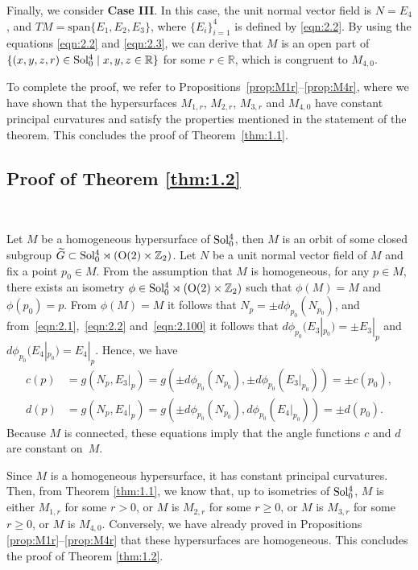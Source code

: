 \documentclass[reqno]{amsart}%
\theoremstyle{definition}
\numberwithin{equation}{section}
\begin{document}
	Finally, we consider {\bf Case III}. In this case, the unit normal
	vector field is $N=E_4$, and $TM=\text{span}\{E_1,E_2,E_3\}$,
	where $\{E_i\}_{i=1}^4$ is defined by \eqref{eqn:2.2}. By using the equations \eqref{eqn:2.2} and \eqref{eqn:2.3}, we can derive that $M$ is an open part of
	$\{(x,y,z,r)\in {\rm Sol_0^4}\mid x,y,z\in\mathbb{R}\}$
	for some $r\in\mathbb{R}$, which is congruent to $M_{4,0}$.
	
	To complete the proof, we refer to Propositions~\ref{prop:M1r}--\ref{prop:M4r}, where we have shown that the hypersurfaces $M_{1,r}$, $M_{2,r}$, $M_{3,r}$ and $M_{4,0}$ have constant principal curvatures and satisfy the properties mentioned in the statement of the theorem.
	This concludes the proof of Theorem~\ref{thm:1.1}.
	
	\subsection{Proof of Theorem \texorpdfstring{\ref{thm:1.2}}{1.2}}~
	
	Let $M$ be a homogeneous hypersurface of ${\rm Sol_0^4}$, 
	then $M$ is an orbit of some closed subgroup $\widetilde{G}\subset{\rm Sol_0^4}\rtimes({\rm O(2)}\times\mathbb{Z}_2)$. 
	Let $N$ be a unit normal vector field of $M$ and fix a point $p_{0} \in M$.
	From the assumption that $M$ is homogeneous, for any $p \in M$,
	there exists an isometry $\phi\in {\rm Sol_0^4}\rtimes({\rm O(2)}\times\mathbb{Z}_2)$
	such that $\phi\left(M\right)=M$ and $\phi(p_{0})=p$.
	From $\phi(M)=M$ it follows that $N_{p}=\pm d \phi_{p_{0}}(N_{p_{0}})$, and from~\eqref{eqn:2.1},~\eqref{eqn:2.2} and~\eqref{eqn:2.100} it follows that
	$d\phi_{p_{0}} (E_3|_{p_{0}})=\pm E_3|_{p}$ and
	$d\phi_{p_{0}} (E_4|_{p_{0}})=E_4|_{p}$.
	Hence, we have
	$$
	\begin{aligned}
		c(p)&=g(N_{p},E_3|_{p})=g(\pm d \phi_{p_{0}}(N_{p_{0}}),\pm d\phi_{p_{0}} (E_3|_{p_{0}}))=\pm c(p_{0}),\\
		d(p)&=g(N_{p},E_4|_{p})=g(\pm d \phi_{p_{0}}(N_{p_{0}}),d\phi_{p_{0}} (E_4|_{p_{0}}))=\pm d(p_{0}).
	\end{aligned}
	$$
	Because $M$ is connected, these equations imply that
	the angle functions $c$ and $d$ are constant on~$M$.
	
	Since $M$ is a homogeneous hypersurface, it has constant principal curvatures. Then, from
	Theorem \ref{thm:1.1},
	we know that, up to isometries of ${\rm Sol_0^4}$,
	$M$ is either $M_{1,r}$ for some $r>0$, or $M$ is $M_{2,r}$ for some $r\geq0$,
	or $M$ is $M_{3,r}$ for some $r\geq0$, or $M$ is $M_{4,0}$.
	Conversely, we have already proved in Propositions \ref{prop:M1r}--\ref{prop:M4r}
	that these hypersurfaces are homogeneous.
	This concludes the proof of Theorem \ref{thm:1.2}.
	
\end{document}
